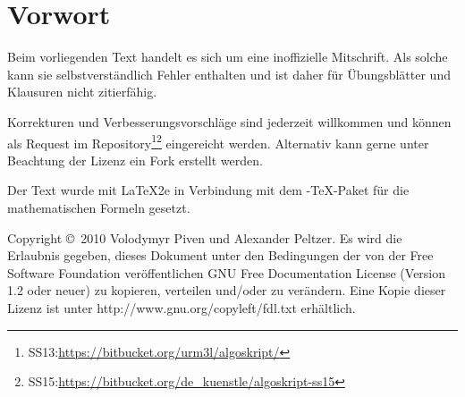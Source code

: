 %
%

\section*{Vorwort}
Beim vorliegenden Text handelt es sich um eine inoffizielle Mitschrift.
Als solche kann sie selbstverständlich Fehler enthalten und ist daher für
Übungsblätter und Klausuren nicht zitierfähig.

Korrekturen und Verbesserungsvorschläge sind jederzeit willkommen und können als Request im Repository\footnote{SS13:\url{https://bitbucket.org/urm3l/algoskript/}}\footnote{SS15:\url{https://bitbucket.org/de_kuenstle/algoskript-ss15}} eingereicht werden. Alternativ kann gerne unter Beachtung der Lizenz ein Fork erstellt werden.

Der Text wurde mit \LaTeX2e in Verbindung mit dem \AmS-\TeX-Paket für die mathematischen
Formeln gesetzt.

{\scriptsize
Copyright \copyright\ 2010  Volodymyr Piven und Alexander Peltzer.
Es wird die Erlaubnis gegeben, dieses Dokument unter den Bedingungen der von der Free
Software Foundation veröffentlichen  GNU Free
Documentation License (Version 1.2 oder neuer) zu kopieren, verteilen und/oder
zu verändern. Eine Kopie dieser Lizenz ist unter
http://www.gnu.org/copyleft/fdl.txt erhältlich.
}
